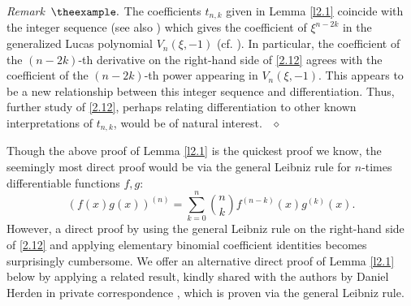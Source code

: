 \documentclass[reqno,10pt,centertags]{amsart}
\newcounter{count}
\numberwithin{equation}{section}
\theoremstyle{remark}
\newenvironment{remark}[1][]{\refstepcounter{theorem}\par\medskip\noindent\textit{Remark~$\theexample. #1$} \rmfamily}{{\ }\hfill $\diamond$ \vspace{6pt}}%
\begin{document}
\begin{remark} 
The coefficients $t_{n,k}$ given in Lemma \ref{l2.1} coincide with the integer sequence \cite[A213234]{OEIS} (see also \cite[A034807]{OEIS}) which gives the coefficient of $\xi^{n-2k}$ in the generalized Lucas polynomial $V_n(\xi,-1)$ (cf. \cite{BH74}). In particular, the coefficient of the $(n-2k)$-th derivative on the right-hand side of \eqref{2.12} agrees with the coefficient of the $(n-2k)$-th power appearing in $V_n(\xi,-1)$. This appears to be a new relationship between this integer sequence and differentiation. Thus, further study of \eqref{2.12}, perhaps relating differentiation to other known interpretations of $t_{n,k}$, would be of natural interest.
\end{remark}

Though the above proof of Lemma \ref{l2.1} is the quickest proof we know, the seemingly most direct proof would be via the general Leibniz rule for $n$-times differentiable functions $f,g$:
\begin{equation}\label{2.20}
(f(x)g(x))^{(n)}=\sum_{k=0}^n \binom{n}{k}f^{(n-k)}(x)g^{(k)}(x).
\end{equation}
However, a direct proof by using the general Leibniz rule on the right-hand side of \eqref{2.12} and applying elementary binomial coefficient identities becomes surprisingly cumbersome. We offer an alternative direct proof of Lemma \ref{l2.1} below by applying a related result, kindly shared with the authors by Daniel Herden in private correspondence \cite{H24}, which is proven via the general Leibniz rule.
\end{document}
